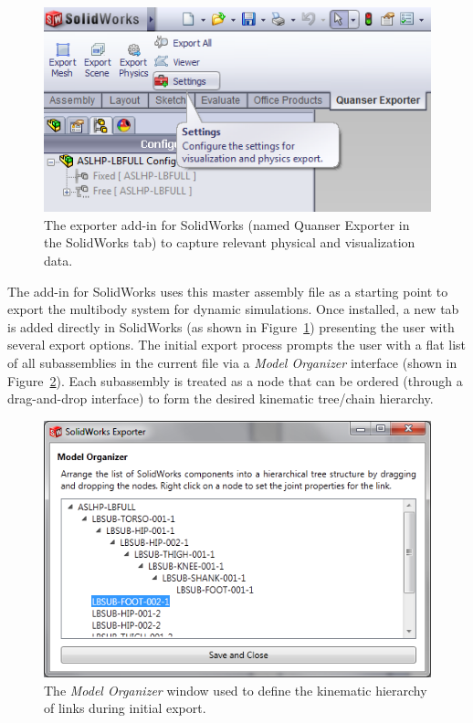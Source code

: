 \begin{figure}[!h]
	\centering
    \includegraphics[scale=1.0]{fig/toolchain/exporter.png}
  	\caption{The exporter add-in for SolidWorks (named Quanser Exporter in the SolidWorks tab) to capture relevant physical and visualization data.}
	\label{fig:swexporter}
\end{figure}

The add-in for SolidWorks uses this master assembly file as a starting point to export the multibody system for dynamic simulations. Once installed, a new tab is added directly in SolidWorks (as shown in Figure~\ref{fig:swexporter}) presenting the user with several export options. The initial export process prompts the user with a flat list of all subassemblies in the current file via a \emph{Model Organizer} interface (shown in Figure~\ref{fig:modelorg}). Each subassembly is treated as a node that can be ordered (through a drag-and-drop interface) to form the desired kinematic tree/chain hierarchy. 


\begin{figure}[!h]
	\centering
    \includegraphics[scale=1.0]{fig/toolchain/modelorg.png}
  	\caption{The \emph{Model Organizer} window used to define the kinematic hierarchy of links during initial export.}
	\label{fig:modelorg}
\end{figure}

